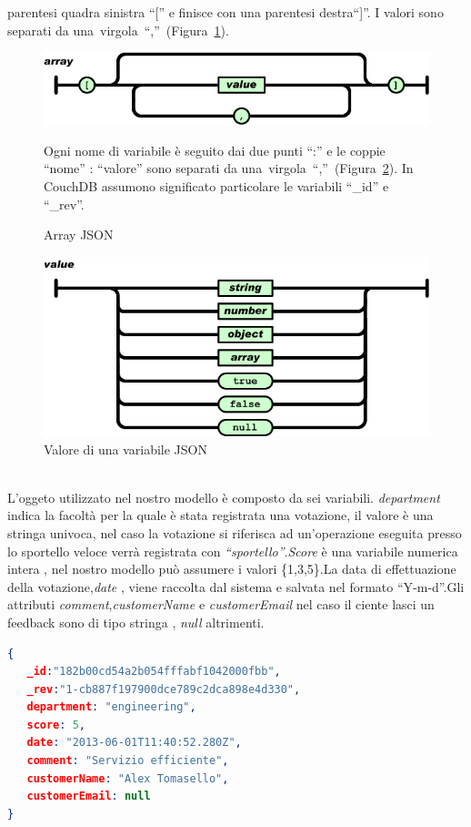 parentesi quadra sinistra ``{[}'' e finisce con una parentesi destra``{]}''. I
valori sono separati da una~virgola~``,''~(Figura~\ref{fig:jsonarray}).
\begin{figure}[!h]
\begin{center}
    \includegraphics[scale=0.50]{icons/jsonarray.png}
    \caption{Array JSON}
    \label{fig:jsonarray}
\end{center}
Ogni nome di variabile è seguito dai due punti ``:'' e le coppie
``nome'' : ``valore'' sono separati
da una~virgola~``,''~(Figura~\ref{fig:jsonvalue}). In CouchDB assumono
significato particolare le variabili ``\_id'' e ``\_rev''. 

\end{figure}
\begin{figure}[!h]
  \begin{center}
      \includegraphics[scale=0.50]{icons/jsonvalue.png}
      \caption{Valore di una variabile JSON}
      \label{fig:jsonvalue}
  \end{center}
\end{figure}

\\L'oggeto utilizzato nel nostro modello è composto da sei variabili.
\emph{department} indica la facoltà per la quale è stata registrata una
votazione, il valore è una stringa univoca, nel caso la votazione si
riferisca ad un'operazione eseguita presso lo sportello veloce verrà registrata
con \emph{``sportello''}.\emph{Score} è una variabile numerica intera , nel
nostro modello può assumere i valori \{1,3,5\}.La data di effettuazione della
votazione,\emph{date} , viene raccolta dal sistema e salvata nel formato
``Y-m-d''.Gli attributi \emph{comment},\emph{customerName} e
\emph{customerEmail} nel caso il ciente lasci un feedback sono di tipo stringa , \emph{null} altrimenti. 
\\
\begin{lstlisting}[language=json] 
{ 
   _id:"182b00cd54a2b054fffabf1042000fbb", 
   _rev:"1-cb887f197900dce789c2dca898e4d330", 
   department: "engineering",
   score: 5,
   date: "2013-06-01T11:40:52.280Z",
   comment: "Servizio efficiente",
   customerName: "Alex Tomasello",
   customerEmail: null
}
\end{lstlisting} 
